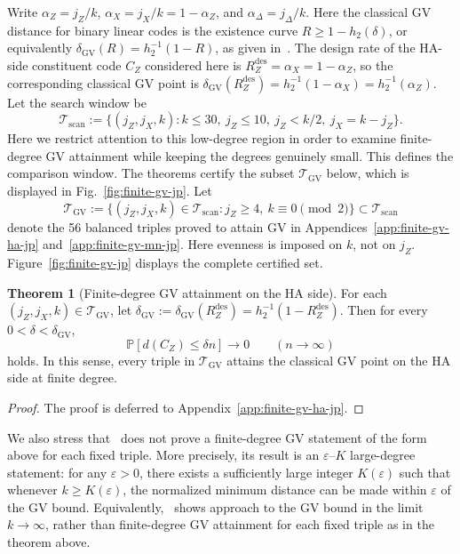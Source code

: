 \documentclass[11pt]{article}
\theoremstyle{definition}
\newtheorem{theorem}{Theorem}[section]
\newcommand{\PP}{\mathbb P}
\newcommand{\h}{h_2}
\newcommand{\CZ}{C_Z}
\begin{document}
Write \(\alpha_Z=j_Z/k\), \(\alpha_X=j_X/k=1-\alpha_Z\), and \(\alpha_\Delta=j_\Delta/k\). Here the classical GV distance for binary linear codes is the existence curve
\(R \ge 1-\h(\delta)\),
or equivalently
\(\delta_{\mathrm{GV}}(R)=\h^{-1}(1-R)\),
as given in~\cite{Gil52,Var57}.
The design rate of the HA-side constituent code \(\CZ\) considered here is
 \(R_Z^{\mathrm{des}}=\alpha_X=1-\alpha_Z\),
so the corresponding classical GV point is
\(\delta_{\mathrm{GV}}(R_Z^{\mathrm{des}})=\h^{-1}(1-\alpha_X)=\h^{-1}(\alpha_Z)\).
Let the search window be
\[
\mathcal T_{\mathrm{scan}}
:=
\{(j_Z,j_X,k): k\le 30,\ j_Z\le 10,\ j_Z<k/2,\ j_X=k-j_Z\}.
\]
Here we restrict attention to this low-degree region in order to examine finite-degree GV attainment while keeping the degrees genuinely small.
This defines the comparison window. The theorems certify the subset \(\mathcal T_{\mathrm{GV}}\) below, which is displayed in Fig.~\ref{fig:finite-gv-jp}.
Let
\[
\mathcal T_{\mathrm{GV}}
:=
\{(j_Z,j_X,k)\in \mathcal T_{\mathrm{scan}}: j_Z\ge 4,\ k\equiv 0\!\!\!\pmod 2\}
\subset \mathcal T_{\mathrm{scan}}
\]
denote the 56 balanced triples proved to attain GV in Appendices~\ref{app:finite-gv-ha-jp} and~\ref{app:finite-gv-mn-jp}. Here evenness is imposed on \(k\), not on \(j_Z\). Figure~\ref{fig:finite-gv-jp} displays the complete certified set.

\begin{theorem}[Finite-degree GV attainment on the HA side]\label{thm:HA-gv-jp}
For each \((j_Z,j_X,k)\in\mathcal T_{\mathrm{GV}}\), let \(\delta_{\mathrm{GV}}:=\delta_{\mathrm{GV}}(R_Z^{\mathrm{des}})=\h^{-1}(1-R_Z^{\mathrm{des}})\). Then for every \(0<\delta<\delta_{\mathrm{GV}}\),
\[
\PP[d(\CZ)\le \delta n]\to 0
\qquad (n\to\infty)
\]
holds. In this sense, every triple in \(\mathcal T_{\mathrm{GV}}\) attains the classical GV point on the HA side at finite degree.
\end{theorem}

\begin{proof}
The proof is deferred to Appendix~\ref{app:finite-gv-ha-jp}.
\end{proof}

We also stress that~\cite[Theorem~2 and Corollary~1]{HA05} does not prove a finite-degree GV statement of the form above for each fixed triple. More precisely, its result is an \(\varepsilon\)--\(K\) large-degree statement: for any \(\varepsilon>0\), there exists a sufficiently large integer \(K(\varepsilon)\) such that whenever \(k\ge K(\varepsilon)\), the normalized minimum distance can be made within \(\varepsilon\) of the GV bound. Equivalently,~\cite{HA05} shows approach to the GV bound in the limit \(k\to\infty\), rather than finite-degree GV attainment for each fixed triple as in the theorem above.
\end{document}
